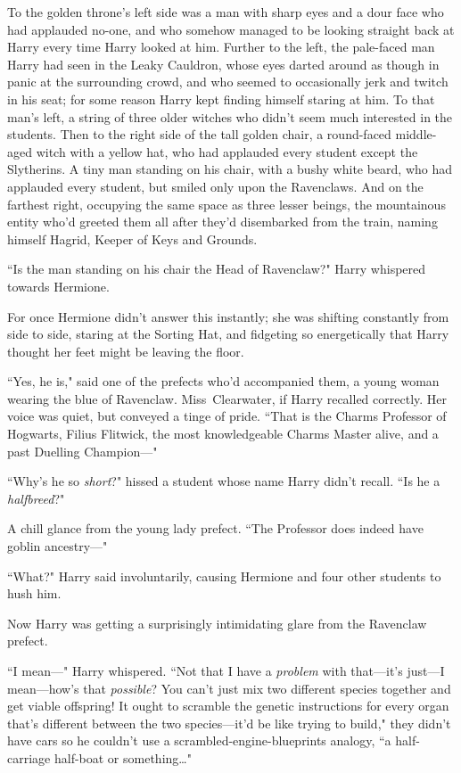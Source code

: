 To the golden throne's left side was a man with sharp eyes and a dour face who had applauded no-one, and who somehow managed to be looking straight back at Harry every time Harry looked at him. Further to the left, the pale-faced man Harry had seen in the Leaky Cauldron, whose eyes darted around as though in panic at the surrounding crowd, and who seemed to occasionally jerk and twitch in his seat; for some reason Harry kept finding himself staring at him. To that man's left, a string of three older witches who didn't seem much interested in the students. Then to the right side of the tall golden chair, a round-faced middle-aged witch with a yellow hat, who had applauded every student except the Slytherins. A tiny man standing on his chair, with a bushy white beard, who had applauded every student, but smiled only upon the Ravenclaws. And on the farthest right, occupying the same space as three lesser beings, the mountainous entity who'd greeted them all after they'd disembarked from the train, naming himself Hagrid, Keeper of Keys and Grounds.

``Is the man standing on his chair the Head of Ravenclaw?" Harry whispered towards Hermione.

For once Hermione didn't answer this instantly; she was shifting constantly from side to side, staring at the Sorting Hat, and fidgeting so energetically that Harry thought her feet might be leaving the floor.

``Yes, he is," said one of the prefects who'd accompanied them, a young woman wearing the blue of Ravenclaw. Miss~Clearwater, if Harry recalled correctly. Her voice was quiet, but conveyed a tinge of pride. ``That is the Charms Professor of Hogwarts, Filius Flitwick, the most knowledgeable Charms Master alive, and a past Duelling Champion—"

``Why's he so \emph{short}?" hissed a student whose name Harry didn't recall. ``Is he a \emph{halfbreed}?"

A chill glance from the young lady prefect. ``The Professor does indeed have goblin ancestry—"

``What?" Harry said involuntarily, causing Hermione and four other students to hush him.

Now Harry was getting a surprisingly intimidating glare from the Ravenclaw prefect.

``I mean—" Harry whispered. ``Not that I have a \emph{problem} with that—it's just—I mean—how's that \emph{possible}? You can't just mix two different species together and get viable offspring! It ought to scramble the genetic instructions for every organ that's different between the two species—it'd be like trying to build," they didn't have cars so he couldn't use a scrambled-engine-blueprints analogy, ``a half-carriage half-boat or something…"

